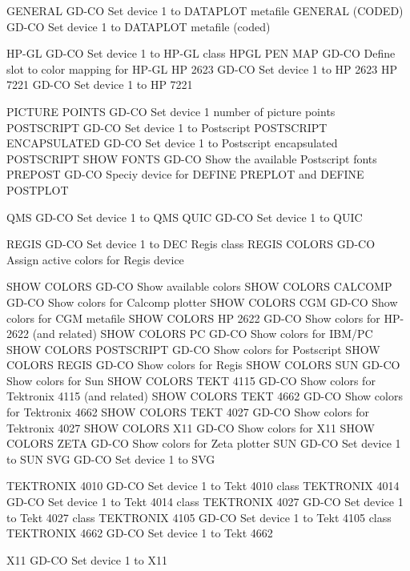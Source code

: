 GENERAL                     GD-CO Set device 1 to DATAPLOT metafile
GENERAL (CODED)             GD-CO Set device 1 to DATAPLOT metafile (coded)

HP-GL                       GD-CO Set device 1 to HP-GL class
HPGL PEN MAP                GD-CO Define slot to color mapping for HP-GL
HP 2623                     GD-CO Set device 1 to HP 2623
HP 7221                     GD-CO Set device 1 to HP 7221

PICTURE POINTS              GD-CO Set device 1 number of picture points
POSTSCRIPT                  GD-CO Set device 1 to Postscript
POSTSCRIPT ENCAPSULATED     GD-CO Set device 1 to Postscript encapsulated
POSTSCRIPT SHOW FONTS       GD-CO Show the available Postscript fonts
PREPOST                     GD-CO Speciy device for DEFINE PREPLOT and DEFINE POSTPLOT

QMS                         GD-CO Set device 1 to QMS
QUIC                        GD-CO Set device 1 to QUIC

REGIS                       GD-CO Set device 1 to DEC Regis class
REGIS COLORS                GD-CO Assign active colors for Regis device

SHOW COLORS                 GD-CO Show available colors
SHOW COLORS CALCOMP         GD-CO Show colors for Calcomp plotter
SHOW COLORS CGM             GD-CO Show colors for CGM metafile
SHOW COLORS HP 2622         GD-CO Show colors for HP-2622 (and related)
SHOW COLORS PC              GD-CO Show colors for IBM/PC
SHOW COLORS POSTSCRIPT      GD-CO Show colors for Postscript
SHOW COLORS REGIS           GD-CO Show colors for Regis
SHOW COLORS SUN             GD-CO Show colors for Sun
SHOW COLORS TEKT 4115       GD-CO Show colors for Tektronix 4115 (and related)
SHOW COLORS TEKT 4662       GD-CO Show colors for Tektronix 4662
SHOW COLORS TEKT 4027       GD-CO Show colors for Tektronix 4027
SHOW COLORS X11             GD-CO Show colors for X11
SHOW COLORS ZETA            GD-CO Show colors for Zeta plotter
SUN                         GD-CO Set device 1 to SUN
SVG                         GD-CO Set device 1 to SVG

TEKTRONIX 4010              GD-CO Set device 1 to Tekt 4010 class
TEKTRONIX 4014              GD-CO Set device 1 to Tekt 4014 class
TEKTRONIX 4027              GD-CO Set device 1 to Tekt 4027 class
TEKTRONIX 4105              GD-CO Set device 1 to Tekt 4105 class
TEKTRONIX 4662              GD-CO Set device 1 to Tekt 4662

X11                         GD-CO Set device 1 to X11

